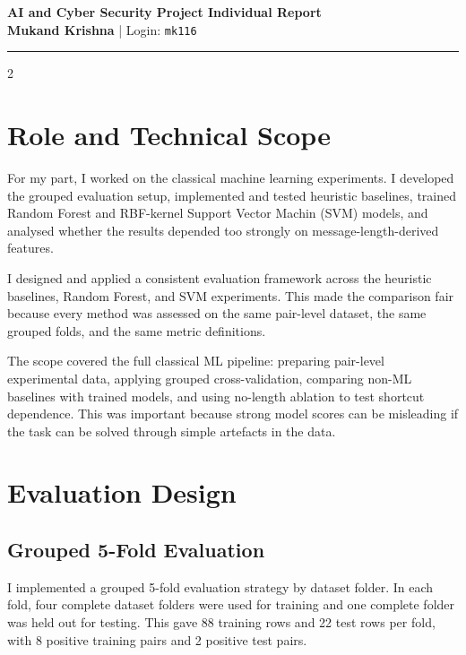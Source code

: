 \documentclass[10pt,a4paper]{article}
\newcommand{\separator}{%
    {\color{KentBlue}\rule{\textwidth}{1.1pt}}
}
\begin{document}
\begin{center}
    \vspace*{-0.35cm}
    {\LARGE\bfseries\color{KentBlue} AI and Cyber Security Project Individual Report}\\[2mm]
    {\normalsize \textbf{Mukand Krishna} \quad | \quad Login: \texttt{mk116}}\\[2mm]
    \separator
\end{center}


\vspace{2mm}
\begin{multicols}{2}

\section{Role and Technical Scope}

For my part, I worked on the classical machine learning experiments. I developed the grouped evaluation setup, implemented and tested heuristic baselines, trained Random Forest and RBF-kernel Support Vector Machin (SVM) models, and analysed whether the results depended too strongly on message-length-derived features.


I designed and applied a consistent evaluation framework across the heuristic baselines, Random Forest, and SVM experiments. This made the comparison fair because every method was assessed on the same pair-level dataset, the same grouped folds, and the same metric definitions.


The scope covered the full classical ML pipeline: preparing pair-level experimental data, applying grouped cross-validation, comparing non-ML baselines with trained models, and using no-length ablation to test shortcut dependence. This was important because strong model scores can be misleading if the task can be solved through simple artefacts in the data.

\section{Evaluation Design}

\subsection{Grouped 5-Fold Evaluation}

I implemented a grouped 5-fold evaluation strategy by dataset folder. In each fold, four complete dataset folders were used for training and one complete folder was held out for testing. This gave 88 training rows and 22 test rows per fold, with 8 positive training pairs and 2 positive test pairs.


\end{multicols}
\end{document}
